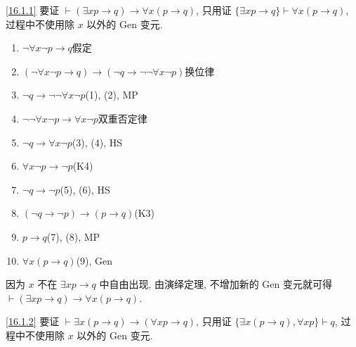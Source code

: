 \documentclass[boxes]{homework}
\begin{document}
\begin{solution}
    \ref{16.1.1} 要证 $\vdash (\exists xp\to q)\to \forall x(p\to q)$, 只用证 $\{\exists xp\to q\}\vdash \forall x(p\to q)$, 过程中不使用除 $x$ 以外的 Gen 变元.
    \begin{enumerate}[label = (\arabic*), itemsep = 0em, topsep = .5em, partopsep = .5em]
        \item $\lnot \forall x \lnot p \to q$\hfill 假定
        \item $(\lnot \forall x \lnot p \to q)\to (\lnot q\to \lnot\lnot \forall x \lnot p)$\hfill 换位律
        \item $\lnot q\to \lnot\lnot \forall x \lnot p$\hfill (1), (2), MP
        \item $\lnot\lnot \forall x\lnot p\to \forall x\lnot p$\hfill 双重否定律
        \item $\lnot q\to \forall x\lnot p$\hfill (3), (4), HS
        \item $\forall x\lnot p\to \lnot p$\hfill (K4)
        \item $\lnot q\to \lnot p$\hfill (5), (6), HS
        \item $(\lnot q\to \lnot p)\to (p\to q)$\hfill (K3)
        \item $p\to q$\hfill (7), (8), MP
        \item $\forall x(p\to q)$\hfill (9), Gen
    \end{enumerate}
    因为 $x$ 不在 $\exists xp\to q$ 中自由出现, 由演绎定理, 不增加新的 Gen 变元就可得 $\vdash (\exists xp\to q)\to \forall x(p\to q)$.

    \ref{16.1.2} 要证 $\vdash \exists x(p\to q)\to (\forall xp\to q)$, 只用证 $\{\exists x(p\to q), \forall xp\}\vdash q$, 过程中不使用除 $x$ 以外的 Gen 变元.


\end{solution}
\end{document}
